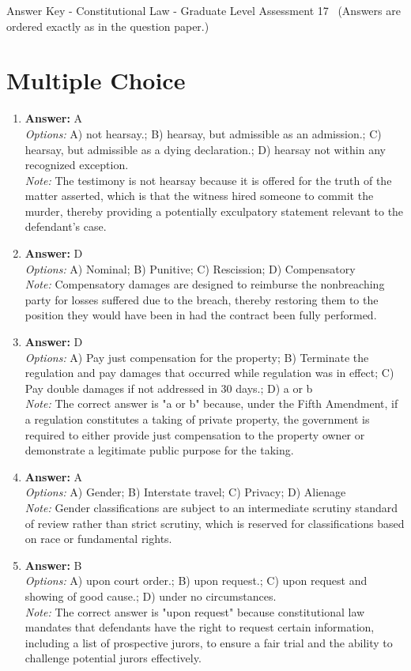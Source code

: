 \documentclass[12pt]{article}
\begin{document}
\begin{center}
Answer Key - Constitutional Law - Graduate Level Assessment 17 \
\small (Answers are ordered exactly as in the question paper.)
\end{center}

\section*{Multiple Choice}
\begin{enumerate}[label=\arabic*.]
\item \textbf{Answer:} A
\\ \textit{Options:} A) not hearsay.; B) hearsay, but admissible as an admission.; C) hearsay, but admissible as a dying declaration.; D) hearsay not within any recognized exception.
\\ \textit{Note:} The testimony is not hearsay because it is offered for the truth of the matter asserted, which is that the witness hired someone to commit the murder, thereby providing a potentially exculpatory statement relevant to the defendant's case.
\item \textbf{Answer:} D
\\ \textit{Options:} A) Nominal; B) Punitive; C) Rescission; D) Compensatory
\\ \textit{Note:} Compensatory damages are designed to reimburse the nonbreaching party for losses suffered due to the breach, thereby restoring them to the position they would have been in had the contract been fully performed.
\item \textbf{Answer:} D
\\ \textit{Options:} A) Pay just compensation for the property; B) Terminate the regulation and pay damages that occurred while regulation was in effect; C) Pay double damages if not addressed in 30 days.; D) a or b
\\ \textit{Note:} The correct answer is "a or b" because, under the Fifth Amendment, if a regulation constitutes a taking of private property, the government is required to either provide just compensation to the property owner or demonstrate a legitimate public purpose for the taking.
\item \textbf{Answer:} A
\\ \textit{Options:} A) Gender; B) Interstate travel; C) Privacy; D) Alienage
\\ \textit{Note:} Gender classifications are subject to an intermediate scrutiny standard of review rather than strict scrutiny, which is reserved for classifications based on race or fundamental rights.
\item \textbf{Answer:} B
\\ \textit{Options:} A) upon court order.; B) upon request.; C) upon request and showing of good cause.; D) under no circumstances.
\\ \textit{Note:} The correct answer is "upon request" because constitutional law mandates that defendants have the right to request certain information, including a list of prospective jurors, to ensure a fair trial and the ability to challenge potential jurors effectively.
\end{enumerate}
\end{document}
